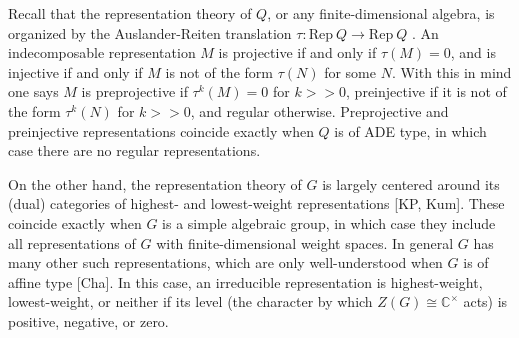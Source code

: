 \documentclass[12pt]{amsart}
\newcommand{\CC}{\mathbb{C}}
\numberwithin{equation}{section}
\begin{document}

Recall that the representation theory of $Q$, or any finite-dimensional algebra, is organized by the Auslander-Reiten translation $\tau: \mathrm{Rep}\: Q \to \mathrm{Rep}\: Q$ \cite{ASS06}. An indecomposable representation $M$ is projective if and only if $\tau(M) = 0$, and is injective if and only if $M$ is not of the form $\tau(N)$ for some $N$. With this in mind one says $M$ is preprojective if $\tau^k(M) = 0$ for $k >> 0$, preinjective if it is not of the form $\tau^k(N)$ for $k >> 0$, and regular otherwise. Preprojective and preinjective representations coincide exactly when $Q$ is of ADE type, in which case there are no regular representations. 

On the other hand, the representation theory of $G$ is largely centered around its (dual) categories of highest- and lowest-weight representations [KP, Kum]. These coincide exactly when $G$ is a simple algebraic group, in which case they include all representations of $G$ with finite-dimensional weight spaces. In general $G$ has many other such representations, which are only well-understood when $G$ is of affine type [Cha]. In this case, an irreducible representation is highest-weight, lowest-weight, or neither if its level (the character by which $Z(G) \cong \CC^\times$ acts) is positive, negative, or zero.

\end{document}
